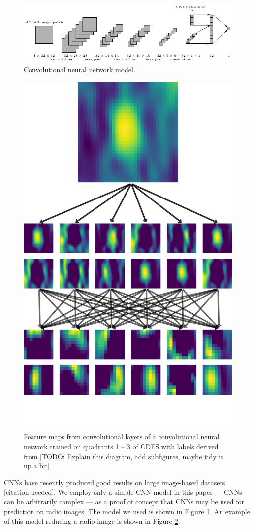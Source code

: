 \documentclass[fleqn,usenatbib,usedcolumn]{mnras}
\begin{document}
    \begin{figure}
      \centering
      \includegraphics[width=\textwidth]{convnet.pdf}
      \caption{Convolutional neural network model.}
      \label{fig:cnn}
    \end{figure}

    \begin{figure}
    \centering
    \includegraphics[width=0.6\columnwidth]{convolutions_42191.pdf}
    \caption{Feature maps from convolutional layers of a convolutional neural
      network trained on quadrants 1 -- 3 of CDFS with labels derived from
      \citeauthor{norris06} [TODO: Explain this diagram, add subfigures, maybe tidy it up a bit]}
    \label{fig:cnn-outputs}
    \end{figure}

    CNNs have recently produced good results on large image-based datasets [citation needed]. We employ only a simple CNN model in this paper
    --- CNNs can be arbitrarily complex --- as a proof of concept that CNNs
    may be used for prediction on radio images. The model we used is shown
    in Figure \ref{fig:cnn}. An example of this model reducing a radio image is shown in Figure \ref{fig:cnn-outputs}.
\end{document}
